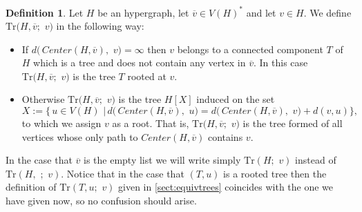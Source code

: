\documentclass[12pt,notitlepage,a4paper]{article}
\theoremstyle{definition}
\newtheorem{definition}{Definition}[section]
\newcommand{\N}{\mathbb{N}}
\begin{document}
\begin{definition}\label{def:TrOperator}
	Let $H$ be an hypergraph, let $\overline{v}\in V(H)^*$ and 
	let $v\in H$. We define $\mathrm{Tr}\big(
	H,\overline{v};\,\, v\big)$ in the following way:
	\begin{itemize}
		\item If $d\big(\, Center(H, \overline{v})
		, \, \, v \big)=\infty$ then $v$ belongs to a connected
		component $T$ of $H$ which is a tree and does not contain
		any vertex in $\overline{v}$. In this case
		$\mathrm{Tr}\big(
		H,\overline{v};\,\, v\big)$ is the tree $T$ rooted at $v$.
		\item Otherwise $\mathrm{Tr}\big(
		H,\overline{v};\,\, v\big)$ is the tree $H[X]$ 
		induced on the set 
		\[
		X:=\big\{\, u\in V(H) \,\, \big| \, 
		d\big(\, Center(H, \overline{v})
		, \, \, u \big)= d\big(\, Center(H, \overline{v})
		, \, \, v \big) + d(v,u)
		\big\},
		\]
		to which we assign $v$ as a root. That is,
		$\mathrm{Tr}\big(
		H,\overline{v};\,\, v\big)$ is the tree formed of all 
		vertices whose only path to $Center(H,\overline{v})$ 
		contains $v$. 		
	\end{itemize}
	In the case that $\overline{v}$ is the empty list we will write
	simply $\mathrm{Tr}(H;\,\, v)$ 
	instead of 
	$\mathrm{Tr}(H,\, \, ;\,\, v)$.
	Notice that in the case that
	$(T,u)$ is a rooted tree then the definition of 
	$\mathrm{Tr}(T,u;\, \, v)$ given in \cref{sect:equivtrees}
	coincides with the one we have
	given now,
	so no confusion should arise. \par
\end{definition}
\end{document}
